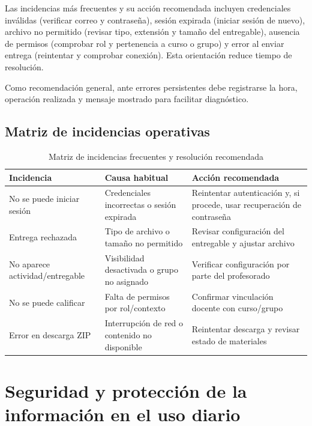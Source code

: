Las incidencias m\'as frecuentes y su acci\'on recomendada incluyen credenciales inv\'alidas (verificar correo y contrase\~na), sesi\'on expirada (iniciar sesi\'on de nuevo), archivo no permitido (revisar tipo, extensi\'on y tama\~no del entregable), ausencia de permisos (comprobar rol y pertenencia a curso o grupo) y error al enviar entrega (reintentar y comprobar conexi\'on). Esta orientaci\'on reduce tiempo de resoluci\'on.

Como recomendaci\'on general, ante errores persistentes debe registrarse
la hora, operaci\'on realizada y mensaje mostrado para facilitar diagn\'ostico.

\subsection{Matriz de incidencias operativas}

\begin{table}[!htbp]
\centering
\begin{tabular}{|P{3.2cm}|P{4.4cm}|P{3.8cm}|}
\hline
\textbf{Incidencia} & \textbf{Causa habitual} & \textbf{Acci\'on recomendada} \\
\hline
No se puede iniciar sesi\'on & Credenciales incorrectas o sesi\'on expirada & Reintentar autenticaci\'on y, si procede, usar recuperaci\'on de contrase\~na \\
\hline
Entrega rechazada & Tipo de archivo o tama\~no no permitido & Revisar configuraci\'on del entregable y ajustar archivo \\
\hline
No aparece actividad/entregable & Visibilidad desactivada o grupo no asignado & Verificar configuraci\'on por parte del profesorado \\
\hline
No se puede calificar & Falta de permisos por rol/contexto & Confirmar vinculaci\'on docente con curso/grupo \\
\hline
Error en descarga ZIP & Interrupci\'on de red o contenido no disponible & Reintentar descarga y revisar estado de materiales \\
\hline
\end{tabular}
\caption{Matriz de incidencias frecuentes y resoluci\'on recomendada}
\label{tab:manual-incidencias}
\end{table}

\FloatBarrier

\section{Seguridad y protecci\'on de la informaci\'on en el uso diario}

